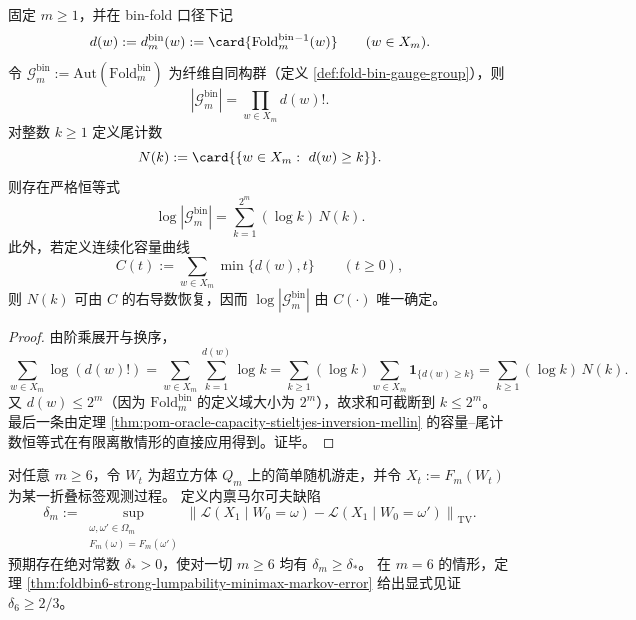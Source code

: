 \begin{proposition}\label{prop:fold-bin-gauge-volume-stieltjes-sum}
固定 \(m\ge 1\)，并在 bin-fold 口径下记
\[
d(w):=d^{\mathrm{bin}}_m(w):=\card{\mathrm{Fold}^{\mathrm{bin}}_m{}^{-1}(w)}\qquad(w\in X_m).
\]
令 \(\mathcal{G}^{\mathrm{bin}}_m:=\mathrm{Aut}(\mathrm{Fold}^{\mathrm{bin}}_m)\) 为纤维自同构群（定义 \ref{def:fold-bin-gauge-group}），则
\[
|\mathcal{G}^{\mathrm{bin}}_m|=\prod_{w\in X_m} d(w)!.
\]
对整数 \(k\ge 1\) 定义尾计数
\[
N(k):=\card{\{w\in X_m:\ d(w)\ge k\}}.
\]
则存在严格恒等式
\[
\log|\mathcal{G}^{\mathrm{bin}}_m|
=\sum_{k=1}^{2^m}(\log k)\,N(k).
\]
此外，若定义连续化容量曲线
\[
C(t):=\sum_{w\in X_m}\min\{d(w),t\}\qquad(t\ge 0),
\]
则 \(N(k)\) 可由 \(C\) 的右导数恢复，因而 \(\log|\mathcal{G}^{\mathrm{bin}}_m|\) 由 \(C(\cdot)\) 唯一确定。
\end{proposition}

\begin{proof}
由阶乘展开与换序，
\[
\sum_{w\in X_m}\log(d(w)!)
=\sum_{w\in X_m}\sum_{k=1}^{d(w)}\log k
=\sum_{k\ge 1}(\log k)\sum_{w\in X_m}\mathbf 1_{\{d(w)\ge k\}}
=\sum_{k\ge 1}(\log k)\,N(k).
\]
又 \(d(w)\le 2^m\)（因为 \(\mathrm{Fold}^{\mathrm{bin}}_m\) 的定义域大小为 \(2^m\)），故求和可截断到 \(k\le 2^m\)。
最后一条由定理 \ref{thm:pom-oracle-capacity-stieltjes-inversion-mellin} 的容量--尾计数恒等式在有限离散情形的直接应用得到。证毕。
\end{proof}

\begin{conjecture}\label{conj:fold-markovization-defect-universal-lower-bound}
对任意 \(m\ge 6\)，令 \(W_t\) 为超立方体 \(Q_m\) 上的简单随机游走，并令 \(X_t:=F_m(W_t)\) 为某一折叠标签观测过程。
定义内禀马尔可夫缺陷
\[
\delta_m:=
\sup_{\substack{\omega,\omega'\in\Omega_m\\ F_m(\omega)=F_m(\omega')}}
\left\|
\mathcal L(X_1\mid W_0=\omega)-\mathcal L(X_1\mid W_0=\omega')
\right\|_{\mathrm{TV}}.
\]
预期存在绝对常数 \(\delta_\ast>0\)，使对一切 \(m\ge 6\) 均有 \(\delta_m\ge \delta_\ast\)。
在 \(m=6\) 的情形，定理 \ref{thm:foldbin6-strong-lumpability-minimax-markov-error} 给出显式见证 \(\delta_6\ge 2/3\)。
\end{conjecture}

\endinput

